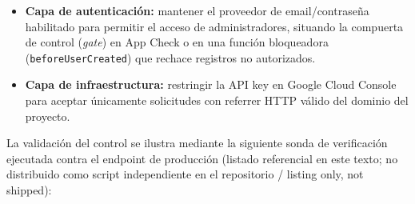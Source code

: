 \documentclass[14pt,a4paper,oneside]{extbook}
\begin{document}
\begin{itemize}
  \item \textbf{Capa de autenticación:} mantener el proveedor de email/contraseña habilitado para permitir el acceso de administradores, situando la compuerta de control (\textit{gate}) en App Check o en una función bloqueadora (\texttt{beforeUserCreated}) que rechace registros no autorizados.
  \item \textbf{Capa de infraestructura:} restringir la API key en Google Cloud Console para aceptar únicamente solicitudes con referrer HTTP válido del dominio del proyecto.
\end{itemize}

La validación del control se ilustra mediante la siguiente sonda de verificación ejecutada contra el endpoint de producción (listado referencial en este texto; no distribuido como script independiente en el repositorio / listing only, not shipped):
\end{document}
